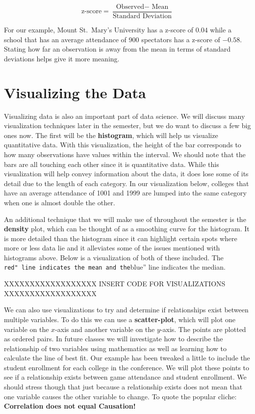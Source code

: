 \documentclass[
  letterpaper,
  DIV=11,
  numbers=noendperiod]{scrreprt}
\begin{document}
\[\text{z-score}=\frac{\text{Observed} - \text{ Mean}}{\text{Standard Deviation}}\]

For our example, Mount St.~Mary's University has a z-score of \(0.04\)
while a school that has an average attendance of 900 spectators has a
z-score of \(-0.58\). Stating how far an observation is away from the
mean in terms of standard deviations helps give it more meaning.

\section{Visualizing the Data}\label{visualizing-the-data}

Visualizing data is also an important part of data science. We will
discuss many visualization techniques later in the semester, but we do
want to discuss a few big ones now. The first will be the
\textbf{histogram}, which will help us visualize quantitative data. With
this visualization, the height of the bar corresponds to how many
observations have values within the interval. We should note that the
bars are all touching each other since it is quantitative data. While
this visualization will help convey information about the data, it does
lose some of its detail due to the length of each category. In our
visualization below, colleges that have an average attendance of 1001
and 1999 are lumped into the same category when one is almost double the
other.

An additional technique that we will make use of throughout the semester
is the \textbf{density} plot, which can be thought of as a smoothing
curve for the histogram. It is more detailed than the histogram since it
can highlight certain spots where more or less data lie and it
alleviates some of the issues mentioned with histograms above. Below is
a visualization of both of these included. The
\texttt{red"\ line\ indicates\ the\ mean\ and\ the}blue'' line indicates
the median.

XXXXXXXXXXXXXXXXXX INSERT CODE FOR VISUALIZATIONS XXXXXXXXXXXXXXXXXX

We can also use visualizations to try and determine if relationships
exist between multiple variables. To do this we can use a
\textbf{scatter-plot}, which will plot one variable on the \(x\)-axis
and another variable on the \(y\)-axis. The points are plotted as
ordered pairs. In future classes we will investigate how to describe the
relationship of two variables using mathematics as well as learning how
to calculate the line of best fit. Our example has been tweaked a little
to include the student enrollment for each college in the conference. We
will plot these points to see if a relationship exists between game
attendance and student enrollment. We should stress though that just
because a relationship exists does not mean that one variable causes the
other variable to change. To quote the popular cliche:
\textbf{Correlation does not equal Causation!}
\end{document}
